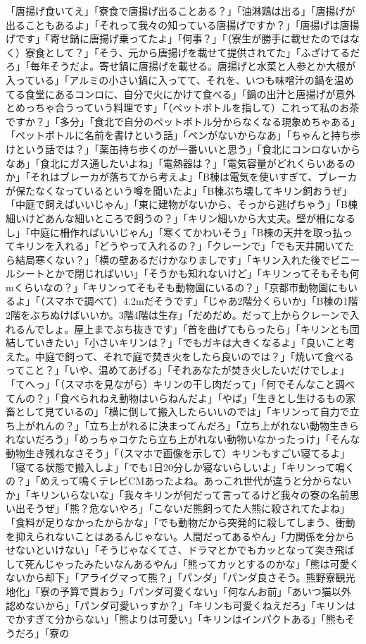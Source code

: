 「唐揚げ食いてえ」「寮食で唐揚げ出ることある？」「油淋鶏は出る」「唐揚げが出ることもあるよ」「それって我々の知っている唐揚げですか？」「唐揚げは唐揚げです」「寄せ鍋に唐揚げ乗ってたよ」「何事？」「（寮生が勝手に載せたのではなく）寮食として？」「そう、元から唐揚げを載せて提供されてた」「ふざけてるだろ」「毎年そうだよ。寄せ鍋に唐揚げを載せる。唐揚げと水菜と人参とか大根が入っている」「アルミの小さい鍋に入ってて、それを、いつも味噌汁の鍋を温めてる食堂にあるコンロに、自分で火にかけて食べる」「鍋の出汁と唐揚げが意外とめっちゃ合うっていう料理です」「（ペットボトルを指して）これって私のお茶ですか？」「多分」「食北で自分のペットボトル分からなくなる現象めちゃある」「ペットボトルに名前を書けという話」「ペンがないからなあ」「ちゃんと持ち歩けという話では？」「薬缶持ち歩くのが一番いいと思う」「食北にコンロないからなあ」「食北にガス通したいよね」「電熱器は？」「電気容量がどれくらいあるのか」「それはブレーカが落ちてから考えよ」「B棟は電気を使いすぎて、ブレーカが保たなくなっているという噂を聞いたよ」「B棟ぶち壊してキリン飼おうぜ」「中庭で飼えばいいじゃん」「東に建物がないから、そっから逃げちゃう」「B棟細いけどあんな細いところで飼うの？」「キリン細いから大丈夫。壁が柵になるし」「中庭に柵作ればいいじゃん」「寒くてかわいそう」「B棟の天井を取っ払ってキリンを入れる」「どうやって入れるの？」「クレーンで」「でも天井開いてたら結局寒くない？」「横の壁あるだけかなりましです」「キリン入れた後でビニールシートとかで閉じればいい」「そうかも知れないけど」「キリンってそもそも何mくらいなの？」「キリンってそもそも動物園にいるの？」「京都市動物園にもいるよ」「（スマホで調べて）4.2mだそうです」「じゃあ2階分くらいか」「B棟の1階2階をぶちぬけばいいか。3階4階は生存」「だめだめ。だって上からクレーンで入れるんでしょ。屋上までぶち抜きです」「首を曲げてもらったら」「キリンとも団結していきたい」「小さいキリンは？」「でもガキは大きくなるよ」「良いこと考えた。中庭で飼って、それで庭で焚き火をしたら良いのでは？」「焼いて食べるってこと？」「いや、温めてあげる」「それあなたが焚き火したいだけでしょ」「てへっ」「（スマホを見ながら）キリンの干し肉だって」「何でそんなこと調べてんの？」「食べられねえ動物はいらねんだよ」「やば」「生きとし生けるもの家畜として見ているの」「横に倒して搬入したらいいのでは」「キリンって自力で立ち上がれんの？」「立ち上がれるに決まってんだろ」「立ち上がれない動物生きられないだろう」「めっちゃコケたら立ち上がれない動物いなかったっけ」「そんな動物生き残れなさそう」「（スマホで画像を示して）キリンもすごい寝てるよ」「寝てる状態で搬入しよ」「でも1日20分しか寝ないらしいよ」「キリンって鳴くの？」「めえって鳴くテレビCMあったよね。あっこれ世代が違うと分からないか」「キリンいらないな」「我々キリンが何だって言ってるけど我々の寮の名前思い出そうぜ」「熊？危ないやろ」「こないだ熊飼ってた人熊に殺されてたよね」「食料が足りなかったからかな」「でも動物だから突発的に殺してしまう、衝動を抑えられないことはあるんじゃない。人間だってあるやん」「力関係を分からせないといけない」「そうじゃなくてさ、ドラマとかでもカッとなって突き飛ばして死んじゃったみたいなんあるやん」「熊ってカッとするのかな」「熊は可愛くないから却下」「アライグマって熊？」「パンダ」「パンダ良さそう。熊野寮観光地化」「寮の予算で買おう」「パンダ可愛くない」「何なんお前」「あいつ猫以外認めないから」「パンダ可愛いっすか？」「キリンも可愛くねえだろ」「キリンはでかすぎて分からない」「熊よりは可愛い」「キリンはインパクトある」「熊もそうだろ」「寮の